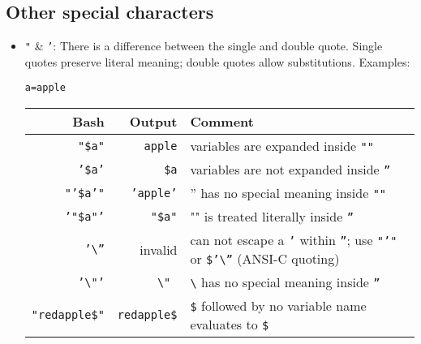\documentclass{article}
\newcommand{\inlinecode}[1]{\colorbox{backcolour}{\footnotesize{\texttt{#1}}}}
\begin{document}
\subsection{Other special characters}
\begin{itemize}
	\item \inlinecode{"} \& \inlinecode{'}: There is a difference between the single and double quote. Single quotes preserve literal meaning; double quotes allow substitutions.
	      Examples:
	      \begin{lstlisting}[style=command]
a=apple
\end{lstlisting}
	      \footnotesize{\begin{tabularx}{\linewidth}{ | r | r |>{\raggedright\arraybackslash}X|}\hline
			      \textbf{Bash}                  & \textbf{Output}                & \textbf{Comment}                                                                                                                  \\\hline
			      \inlinecode{"\$a"}             & \inlinecode{apple}             & variables are expanded inside \inlinecode{""}                                                                                     \\\hline
			      \inlinecode{'\$a'}             & \inlinecode{\$a}               & variables are not expanded inside \inlinecode{''}                                                                                 \\\hline
			      \inlinecode{"'\$a'"}           & \inlinecode{'apple'}           & '' has no special meaning inside \inlinecode{""}                                                                                  \\\hline
			      \inlinecode{'"\$a"'}           & \inlinecode{"\$a"}             & "" is treated literally inside \inlinecode{''}                                                                                    \\\hline
			      \inlinecode{'\textbackslash''} & invalid                        & can not escape a \inlinecode{'} within \inlinecode{''}; use \inlinecode{"'"} or \inlinecode{\$'\textbackslash''} (ANSI-C quoting) \\\hline
			      \inlinecode{'\textbackslash"'} & \inlinecode{\textbackslash" }  & \inlinecode{\textbackslash} has no special meaning inside \inlinecode{''}                                                         \\\hline
			      \inlinecode{"redapple\$"}      & \inlinecode{redapple\$}        & \inlinecode{\$} followed by no variable name evaluates to \inlinecode{\$}                                                         \\\hline

\end{tabularx}}
\end{itemize}
\end{document}
